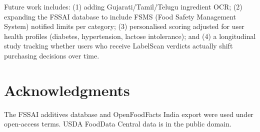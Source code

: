 \documentclass[conference]{IEEEtran}
\begin{document}
Future work includes: (1) adding Gujarati/Tamil/Telugu ingredient OCR;
(2) expanding the FSSAI database to include FSMS (Food Safety Management System)
notified limits per category; (3) personalised scoring adjusted for user
health profiles (diabetes, hypertension, lactose intolerance); and
(4) a longitudinal study tracking whether users who receive LabelScan
verdicts actually shift purchasing decisions over time.

\section*{Acknowledgments}
The FSSAI additives database and OpenFoodFacts India export were used under
open-access terms. USDA FoodData Central data is in the public domain.

\end{document}
